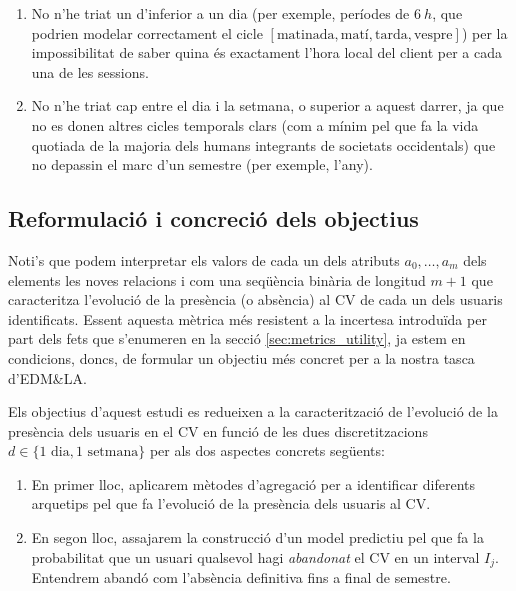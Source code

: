 \documentclass[
	a4paper,
	twoside,
	justified
]{tufte-book}
\begin{document}
\begin{enumerate}[(1)]

\item No n'he triat un d'inferior a un dia (per exemple, períodes de $\SI{6}{h}$, que podrien modelar correctament el cicle $[\text{matinada}, \text{matí}, \text{tarda}, \text{vespre}]$) per la impossibilitat de saber quina és exactament l'hora local del client per a cada una de les sessions.

\item No n'he triat cap entre el dia i la setmana, o superior a aquest darrer, ja que no es donen altres cicles temporals clars (com a mínim pel que fa la vida quotiada de la majoria dels humans integrants de societats occidentals) que no depassin el marc d'un semestre (per exemple, l'any). 

\end{enumerate} 
 
\subsection{Reformulació i concreció dels objectius}

Noti's que podem interpretar els valors de cada un dels atributs $a_0, \ldots, a_m$ dels elements les noves relacions  i  com una seqüència binària de longitud $m+1$ que caracteritza l'evolució de la presència (o absència) al CV de cada un dels usuaris identificats. Essent aquesta mètrica més resistent a la incertesa introduïda per part dels fets que s'enumeren en la secció \ref{sec:metrics_utility}, ja estem en condicions, doncs, de formular un objectiu més concret per a la nostra tasca d'EDM\&LA. 

\begin{shaded}

Els objectius d'aquest estudi es redueixen a la caracterització de l'evolució de la presència dels usuaris en el CV en funció de les dues discretitzacions $d \in \{1\text{ dia},1\text{ setmana}\}$ per als dos aspectes concrets següents:

\begin{enumerate}[(1)]

\item En primer lloc, aplicarem mètodes d'agregació per a identificar diferents arquetips pel que fa l'evolució de la presència dels usuaris al CV.

\item En segon lloc, assajarem la construcció d'un model predictiu pel que fa la probabilitat que un usuari qualsevol hagi \emph{abandonat} el CV en un interval $I_j$. Entendrem abandó com l'absència definitiva fins a final de semestre.  

\end{enumerate}  
\end{shaded}   
\end{document}
